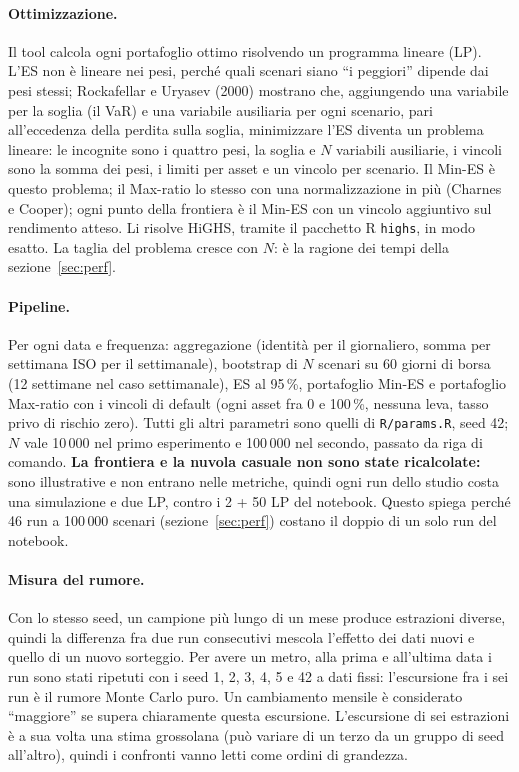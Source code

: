 \documentclass[11pt,a4paper]{article}
\begin{document}
\paragraph{Ottimizzazione.} Il tool calcola ogni portafoglio ottimo risolvendo un programma lineare (LP). L'ES non \`e lineare nei pesi, perch\'e quali scenari siano ``i peggiori'' dipende dai pesi stessi; Rockafellar e Uryasev (2000) mostrano che, aggiungendo una variabile per la soglia (il VaR) e una variabile ausiliaria per ogni scenario, pari all'eccedenza della perdita sulla soglia, minimizzare l'ES diventa un problema lineare: le incognite sono i quattro pesi, la soglia e $N$ variabili ausiliarie, i vincoli sono la somma dei pesi, i limiti per asset e un vincolo per scenario. Il Min-ES \`e questo problema; il Max-ratio lo stesso con una normalizzazione in pi\`u (Charnes e Cooper); ogni punto della frontiera \`e il Min-ES con un vincolo aggiuntivo sul rendimento atteso. Li risolve HiGHS, tramite il pacchetto R \texttt{highs}, in modo esatto. La taglia del problema cresce con $N$: \`e la ragione dei tempi della sezione~\ref{sec:perf}.

\paragraph{Pipeline.} Per ogni data e frequenza: aggregazione (identit\`a per il giornaliero, somma per settimana ISO per il settimanale), bootstrap di $N$ scenari su 60 giorni di borsa (12 settimane nel caso settimanale), ES al 95\,\%, portafoglio Min-ES e portafoglio Max-ratio con i vincoli di default (ogni asset fra 0 e 100\,\%, nessuna leva, tasso privo di rischio zero). Tutti gli altri parametri sono quelli di \texttt{R/params.R}, seed 42; $N$ vale 10\,000 nel primo esperimento e 100\,000 nel secondo, passato da riga di comando. \textbf{La frontiera e la nuvola casuale non sono state ricalcolate:} sono illustrative e non entrano nelle metriche, quindi ogni run dello studio costa una simulazione e due LP, contro i 2 + 50 LP del notebook. Questo spiega perch\'e 46 run a 100\,000 scenari (sezione~\ref{sec:perf}) costano il doppio di un solo run del notebook.

\paragraph{Misura del rumore.} Con lo stesso seed, un campione pi\`u lungo di un mese produce estrazioni diverse, quindi la differenza fra due run consecutivi mescola l'effetto dei dati nuovi e quello di un nuovo sorteggio. Per avere un metro, alla prima e all'ultima data i run sono stati ripetuti con i seed 1, 2, 3, 4, 5 e 42 a dati fissi: l'escursione fra i sei run \`e il rumore Monte Carlo puro. Un cambiamento mensile \`e considerato ``maggiore'' se supera chiaramente questa escursione. L'escursione di sei estrazioni \`e a sua volta una stima grossolana (pu\`o variare di un terzo da un gruppo di seed all'altro), quindi i confronti vanno letti come ordini di grandezza.
\end{document}
